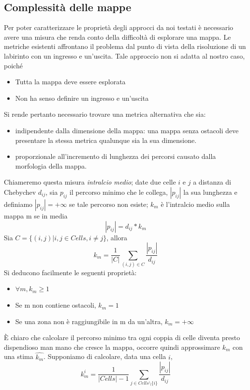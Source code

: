 \subsection{Complessità delle mappe}
\label{mapcomplex}
  Per poter caratterizzare le proprietà degli approcci da noi testati è necessario
  avere una misura che renda conto della difficoltà di esplorare una mappa.
  Le metriche esistenti affrontano il problema dal punto di vista della risoluzione
  di un labirinto con un ingresso e un'uscita. Tale approccio non si adatta al 
  nostro caso, poiché
  \begin{itemize}
	\item Tutta la mappa deve essere esplorata
	\item Non ha senso definire un ingresso e un'uscita
  \end{itemize}
  Si rende pertanto necessario trovare una metrica alternativa che sia:
  \begin{itemize}
	\item indipendente dalla dimensione della mappa: una mappa senza ostacoli 
	      deve presentare la stessa metrica qualunque sia la sua dimensione.
	\item proporzionale all'incremento di lunghezza dei percorsi causato dalla
	      morfologia della mappa.
  \end{itemize}
  Chiameremo questa misura \emph{intralcio medio}; date due celle $i$ e $j$ a 
  distanza di Chebychev $d_{ij}$, sia $p_{ij}$ il percorso minimo che le
  collega, $|p_{ij}|$ la sua lunghezza e definiamo $|p_{ij}| = +\infty$ se tale
  percorso non esiste; $k_m$ è l'intralcio medio sulla mappa m
  se in media $$|p_{ij}| = d_{ij} * k_m$$ 
  Sia $C = \{ (i,j) | i,j \in Cells, i \neq j \} $, allora
  $$k_m = \frac{1}{|C|} \sum_{(i,j) \in C}\frac{|p_{ij}|}{d_{ij}}$$
  Si deducono facilmente le seguenti proprietà:
  \begin{itemize}
	\item $\forall m, k_m \geq 1$
	\item Se m non contiene ostacoli, $k_m = 1$
    \item Se una zona non è raggiungibile in m da un'altra, $k_m = +\infty$
  \end{itemize}
  È chiaro che calcolare il percorso minimo tra ogni coppia di celle diventa
  presto dispendioso man mano che cresce la mappa, occorre quindi approssimare 
  $k_m$ con una stima $\hat{k_m}$.
  Supponiamo di calcolare, data una cella $i$,
  $$k_m^i = \frac{1}{|Cells| - 1} \sum_{j \in Cells \setminus \{i\}}\frac{|p_{ij}|}{d_{ij}}$$
